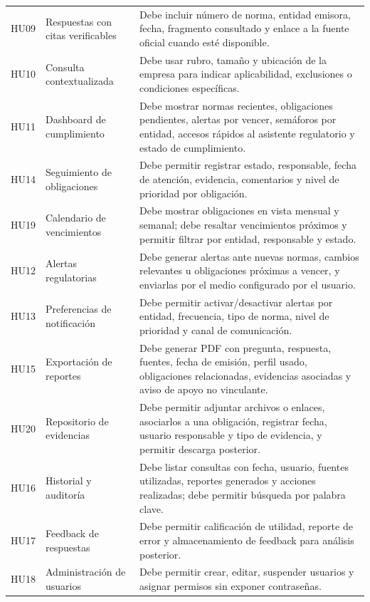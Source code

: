 \documentclass[12pt,a4paper,oneside]{report}
\begin{document}
\begin{longtable}{p{}p{}p{}}
HU09 & Respuestas con citas verificables & Debe incluir número de norma, entidad emisora, fecha, fragmento consultado y enlace a la fuente oficial cuando esté disponible. \\
HU10 & Consulta contextualizada & Debe usar rubro, tamaño y ubicación de la empresa para indicar aplicabilidad, exclusiones o condiciones específicas. \\
HU11 & Dashboard de cumplimiento & Debe mostrar normas recientes, obligaciones pendientes, alertas por vencer, semáforos por entidad, accesos rápidos al asistente regulatorio y estado de cumplimiento. \\
HU14 & Seguimiento de obligaciones & Debe permitir registrar estado, responsable, fecha de atención, evidencia, comentarios y nivel de prioridad por obligación. \\
HU19 & Calendario de vencimientos & Debe mostrar obligaciones en vista mensual y semanal; debe resaltar vencimientos próximos y permitir filtrar por entidad, responsable y estado. \\
HU12 & Alertas regulatorias & Debe generar alertas ante nuevas normas, cambios relevantes u obligaciones próximas a vencer, y enviarlas por el medio configurado por el usuario. \\
HU13 & Preferencias de notificación & Debe permitir activar/desactivar alertas por entidad, frecuencia, tipo de norma, nivel de prioridad y canal de comunicación. \\
HU15 & Exportación de reportes & Debe generar PDF con pregunta, respuesta, fuentes, fecha de emisión, perfil usado, obligaciones relacionadas, evidencias asociadas y aviso de apoyo no vinculante. \\
HU20 & Repositorio de evidencias & Debe permitir adjuntar archivos o enlaces, asociarlos a una obligación, registrar fecha, usuario responsable y tipo de evidencia, y permitir descarga posterior. \\
HU16 & Historial y auditoría & Debe listar consultas con fecha, usuario, fuentes utilizadas, reportes generados y acciones realizadas; debe permitir búsqueda por palabra clave. \\
HU17 & Feedback de respuestas & Debe permitir calificación de utilidad, reporte de error y almacenamiento de feedback para análisis posterior. \\
HU18 & Administración de usuarios & Debe permitir crear, editar, suspender usuarios y asignar permisos sin exponer contraseñas. \\
\bottomrule
\end{longtable}
\end{document}
